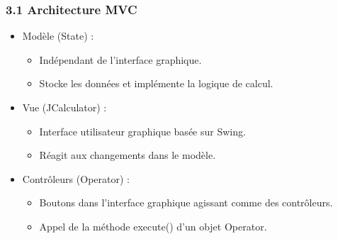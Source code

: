 \documentclass[12pt]{report}
\begin{document}
                \subsubsection*{3.1 Architecture MVC}
                    \begin{itemize}
                        \item Modèle (State) :
                        \begin{itemize}
                            \item Indépendant de l’interface graphique.
                            \item Stocke les données et implémente la logique de calcul.
                        \end{itemize}

                        \item Vue (JCalculator) :
                        \begin{itemize}
                            \item Interface utilisateur graphique basée sur Swing.
                            \item Réagit aux changements dans le modèle.
                        \end{itemize}

                        \item Contrôleurs (Operator) :
                        \begin{itemize}
                            \item Boutons dans l’interface graphique agissant comme des contrôleurs.
                            \item Appel de la méthode execute() d’un objet Operator.
                        \end{itemize}
                    \end{itemize}
\end{document}
